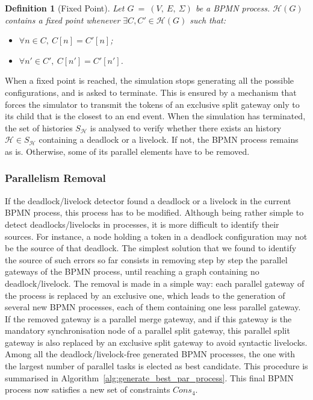 \documentclass{article}
\newcommand{\confset}[1]{\history(#1)}
\newcommand{\graph}{G~=~(V,~E,~\Sigma)}
\newcommand{\history}{\ensuremath{\mathcal{H}}}
\newtheorem{definition}{Definition}
\begin{document}
	\begin{definition}[Fixed Point]
		Let $\graph$ be a BPMN process.
		$\confset{G}$ contains a \textnormal{fixed point} whenever $\exists C, C' \in \confset{G}$ such that:
		\begin{itemize}
			\setlength\itemsep{-0.5em}
			\item[---] $\forall n \in C,\ C[n] = C'[n]$;
			\item[---] $\forall n' \in C',\ C[n'] = C'[n']$.
		\end{itemize}
	\end{definition}
	
	When a fixed point is reached, the simulation stops generating all the possible configurations, and is asked to terminate.
	This is ensured by a mechanism that forces the simulator to transmit the tokens of an exclusive split gateway only to its child that is the closest to an end event.
	When the simulation has terminated, the set of histories $S_\history$ is analysed to verify whether there exists an history $\history \in S_\history$ containing a deadlock or a livelock.
	If not, the BPMN process remains as is.
	Otherwise, some of its parallel elements have to be removed.
	
	\subsubsection{Parallelism Removal}
	
	If the deadlock/livelock detector found a deadlock or a livelock in the current BPMN process, this process has to be modified.
	Although being rather simple to detect deadlocks/livelocks in processes, it is more difficult to identify their sources.
	For instance, a node holding a token in a deadlock configuration may not be the source of that deadlock.
	The simplest solution that we found to identify the source of such errors so far consists in removing step by step the parallel gateways of the BPMN process, until reaching a graph containing no deadlock/livelock.
	The removal is made in a simple way: each parallel gateway of the process is replaced by an exclusive one, which leads to the generation of several new BPMN processes, each of them containing one less parallel gateway.
	If the removed gateway is a parallel merge gateway, and if this gateway is the mandatory synchronisation node of a parallel split gateway, this parallel split gateway is also replaced by an exclusive split gateway to avoid syntactic livelocks.
	Among all the deadlock/livelock-free generated BPMN processes, the one with the largest number of parallel tasks is elected as best candidate. 
	This procedure is summarised in Algorithm~\ref{alg:generate_best_par_process}.
	This final BPMN process now satisfies a new set of constraints $\mathit{Cons}_4$.
	
\end{document}

